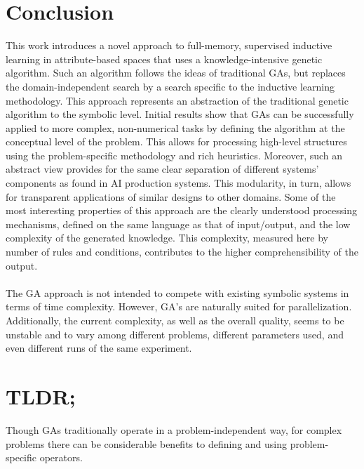 \documentclass[../main.tex]{subfiles}
\begin{document}
\section{Conclusion}
This work introduces a novel approach to full-memory, supervised inductive learning in attribute-based spaces that uses
a knowledge-intensive genetic algorithm. Such an algorithm follows the ideas of traditional GAs, but replaces the
domain-independent search by a search specific to the inductive learning methodology. This approach represents an
abstraction of the traditional genetic algorithm to the symbolic level. Initial results show that GAs can be
successfully applied to more complex, non-numerical tasks by defining the algorithm at the conceptual level of the
problem. This allows for processing high-level structures using the problem-specific methodology and rich heuristics.
Moreover, such an abstract view provides for the same clear separation of different systems' components as found in AI
production systems. This modularity, in turn, allows for transparent applications of similar designs to other domains.
Some of the most interesting properties of this approach are the clearly understood processing mechanisms, defined on
the same language as that of input/output, and the low complexity of the generated knowledge. This complexity, measured
here by number of rules and conditions, contributes to the higher comprehensibility of the output.
\\\\
The GA approach is not intended to compete with existing symbolic systems in terms of time complexity. However, GA's
are naturally suited for parallelization. Additionally, the current complexity, as well as the overall quality, seems
to be unstable and to vary among different problems, different parameters used, and even different runs of the same
experiment.

\section{TLDR;}
Though GAs traditionally operate in a problem-independent way, for complex problems there can be considerable benefits to defining and using problem-specific operators. 
\end{document}
